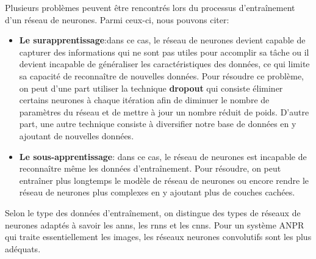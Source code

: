     Plusieurs problèmes peuvent être rencontrés lors du processus d'entraînement d'un réseau de neurones. Parmi ceux-ci, nous pouvons citer:
    \begin{itemize}
        \item \textbf{Le surapprentissage}:dans ce cas, le réseau de neurones devient capable de capturer des informations qui ne sont pas utiles pour accomplir sa tâche ou il devient incapable de généraliser les caractéristiques
        des données, ce qui limite sa capacité de reconnaître de nouvelles données. Pour résoudre ce problème, on peut d'une part utiliser la technique \textbf{dropout} qui consiste éliminer certains neurones à chaque itération afin de diminuer le nombre de paramètres du réseau et de mettre à
        jour un nombre réduit de poids. D'autre part, une autre technique consiste à diversifier notre base de données en y ajoutant de nouvelles données.\cite{dahmaneThesis}
        \item \textbf{Le sous-apprentissage}: dans ce cas, le réseau de neurones est incapable de reconnaître même les données d'entraînement. Pour résoudre, on peut entraîner plus longtemps le modèle de réseau de neurones ou encore rendre le réseau de neurones plus complexes en y ajoutant plus de couches cachées.
    \end{itemize}

    Selon le type des données d'entraînement, on distingue des types de réseaux de neurones adaptés à savoir les \acrshort{ann}s, les \acrshort{rnn}s et les \acrshort{cnn}s. Pour un système ANPR qui traite essentiellement les images, les réseaux neurones convolutifs sont les plus adéquats.

